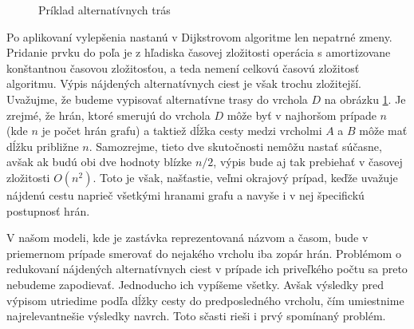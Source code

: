\begin{figure}[H]
  \caption{Príklad alternatívnych trás}
  \label{alternativ_priklad2}
\end{figure}

Po aplikovaní vylepšenia nastanú v Dijkstrovom algoritme len nepatrné zmeny. Pridanie prvku do poľa je z hľadiska časovej zložitosti operácia s amortizovane konštantnou časovou zložitosťou, a teda nemení celkovú časovú zložitosť algoritmu. Výpis nájdených alternatívnych ciest je však trochu zložitejší. Uvažujme, že budeme vypisovať alternatívne trasy do vrchola $D$ na obrázku \ref{alternativ_priklad2}. Je zrejmé, že hrán, ktoré smerujú do vrchola $D$ môže byť v najhoršom prípade $n$ (kde $n$ je počet hrán grafu) a taktiež dĺžka cesty medzi vrcholmi $A$ a $B$ môže mať dĺžku približne $n$. Samozrejme, tieto dve skutočnosti nemôžu nastať súčasne, avšak ak budú obi dve hodnoty blízke $n/2$, výpis bude aj tak prebiehať v časovej zložitosti $O(n^{2})$. Toto je však, našťastie, veľmi okrajový prípad, keďže uvažuje nájdenú cestu naprieč všetkými hranami grafu a navyše i v nej špecifickú postupnosť hrán.\newline

V našom modeli, kde je zastávka reprezentovaná názvom a časom, bude v priemernom prípade smerovať do nejakého vrcholu iba zopár hrán. Problémom o redukovaní nájdených alternatívnych ciest v prípade ich priveľkého počtu sa preto nebudeme zapodievať. Jednoducho ich vypíšeme všetky. Avšak výsledky pred výpisom utriedime podľa dĺžky cesty do predposledného vrcholu, čím umiestnime najrelevantnešie výsledky navrch. Toto sčasti rieši i prvý spomínaný problém.\newline

